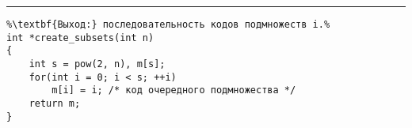 \documentclass{article}
\begin{document}
\vspace{5pt} \hrule
\begin{lstlisting}[caption={Генерация всех подмножеств n-элементного множества}, label=p_39, escapechar=\%]
%\noindent\textbf{Вход:} $n \geqslant 0$ - мощность множества.\\%
%\textbf{Выход:} последовательность кодов подмножеств i.%
int *create_subsets(int n)
{
	int s = pow(2, n), m[s];
	for(int i = 0; i < s; ++i)
		m[i] = i; /* код очередного подмножества */
	return m;
}
\end{lstlisting}
\end{document}
